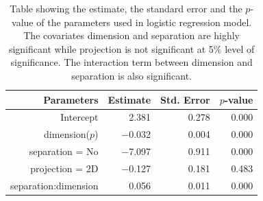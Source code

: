 \begin{table}[ht]
\begin{center}
\caption{Table showing the estimate, the standard error and the $p$-value of the parameters used in logistic regression model. The covariates dimension and separation are highly significant while projection is not significant at 5\% level of significance. The interaction term between dimension and separation is also significant.}
\vspace{0.15cm}
\begin{tabular}{r|rrr}
\hline
  \hline
 Parameters & Estimate & Std. Error  & $p$-value \\ 
  \hline
Intercept  & 2.381 & 0.278  & 0.000 \\ 
  dimension($p$) & $-$0.032 & 0.004  & 0.000 \\ 
  separation = No & $-$7.097 & 0.911  & 0.000 \\ 
  projection = 2D & $-$0.127 & 0.181  & 0.483 \\ 
  separation:dimension & 0.056 & 0.011 & 0.000\\
   \hline
\end{tabular}
\label{params}
\end{center}
\end{table}



